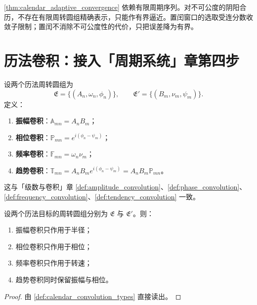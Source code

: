 \begin{remark}[动态调节的边界]\label{rem:calendar_adaptive_boundary}
\cref{thm:calendar_adaptive_convergence} 依赖有限周期序列。对不可公度的阴阳合历，不存在有限周转圆组精确表示，只能作有界逼近。置闰窗口的选取受连分数收敛子限制；置闰不消除不可公度性的代价，只把误差降为有界。
\end{remark}

\section{历法卷积：接入「周期系统」章第四步}
\label{sec:calendar_convolution}

\begin{definition}\label{def:calendar_convolution_types}
设两个历法周转圆组为
\[
\mathfrak E=\{(A_n,\omega_n,\phi_n)\},\qquad
\mathfrak E'=\{(B_m,\nu_m,\psi_m)\}.
\]
定义：
\begin{enumerate}[label=(\roman*)]
    \item \textbf{振幅卷积}：\(\mathbb A_{mn}=A_nB_m\)；
    \item \textbf{相位卷积}：\(\mathbb P_{mn}=e^{i(\phi_n-\psi_m)}\)；
    \item \textbf{频率卷积}：\(\mathbb F_{mn}=\omega_n\nu_m\)；
    \item \textbf{趋势卷积}：\(\mathbb T_{mn}=A_nB_m e^{i(\phi_n-\psi_m)}=A_nB_m\mathbb P_{mn}\)。
\end{enumerate}
这与「级数与卷积」章 \cref{def:amplitude_convolution}、\cref{def:phase_convolution}、\cref{def:frequency_convolution}、\cref{def:tendency_convolution} 一致。
\end{definition}

\begin{theorem}[三类卷积在历法周转圆组上的作用]\label{thm:calendar_convolution_action}
设两个历法目标的周转圆组分别为 \(\mathfrak E\) 与 \(\mathfrak E'\)。则：
\begin{enumerate}[label=(\roman*)]
    \item 振幅卷积只作用于半径；
    \item 相位卷积只作用于相位；
    \item 频率卷积只作用于转速；
    \item 趋势卷积同时保留振幅与相位。
\end{enumerate}
\end{theorem}

\begin{proof}
由 \cref{def:calendar_convolution_types} 直接读出。
\end{proof}

